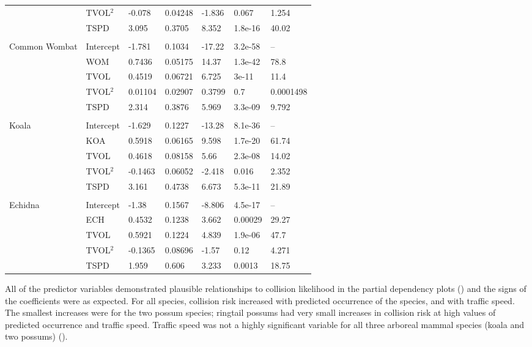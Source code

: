 \begin{table}[htp]
\begin{tabularx}{\textwidth}{lllllll}
   & TVOL$^2$ & -0.078 & 0.04248 & -1.836 & 0.067 & 1.254 \\ 
   & TSPD & 3.095 & 0.3705 & 8.352 & 1.8e-16 & 40.02 \\ 
   &  &  &  &  &  &  \\ 
Common Wombat & Intercept & -1.781 & 0.1034 & -17.22 & 3.2e-58 & -- \\ 
   & WOM & 0.7436 & 0.05175 & 14.37 & 1.3e-42 & 78.8 \\ 
   & TVOL & 0.4519 & 0.06721 & 6.725 & 3e-11 & 11.4 \\ 
   & TVOL$^2$ & 0.01104 & 0.02907 & 0.3799 & 0.7 & 0.0001498 \\ 
   & TSPD & 2.314 & 0.3876 & 5.969 & 3.3e-09 & 9.792 \\ 
   &  &  &  &  &  &  \\ 
Koala & Intercept & -1.629 & 0.1227 & -13.28 & 8.1e-36 & -- \\ 
   & KOA & 0.5918 & 0.06165 & 9.598 & 1.7e-20 & 61.74 \\ 
   & TVOL & 0.4618 & 0.08158 & 5.66 & 2.3e-08 & 14.02 \\ 
   & TVOL$^2$ & -0.1463 & 0.06052 & -2.418 & 0.016 & 2.352 \\ 
   & TSPD & 3.161 & 0.4738 & 6.673 & 5.3e-11 & 21.89 \\ 
   &  &  &  &  &  &  \\ 
Echidna & Intercept & -1.38 & 0.1567 & -8.806 & 4.5e-17 & -- \\ 
   & ECH & 0.4532 & 0.1238 & 3.662 & 0.00029 & 29.27 \\ 
   & TVOL & 0.5921 & 0.1224 & 4.839 & 1.9e-06 & 47.7 \\ 
   & TVOL$^2$ & -0.1365 & 0.08696 & -1.57 & 0.12 & 4.271 \\ 
   & TSPD & 1.959 & 0.606 & 3.233 & 0.0013 & 18.75 \\  
\bottomrule
\end{tabularx}
\label{6sp_sum_coll}
\end{table}

All of the predictor variables demonstrated plausible relationships to collision likelihood in the partial dependency plots () and the signs of the coefficients were as expected. For all species, collision risk increased with predicted occurrence of the species, and with traffic speed. The smallest increases were for the two possum species; ringtail possums had very small increases in collision risk at high values of predicted occurrence and traffic speed.  Traffic speed was not a highly significant variable for all three arboreal mammal species (koala and two possums) ().

